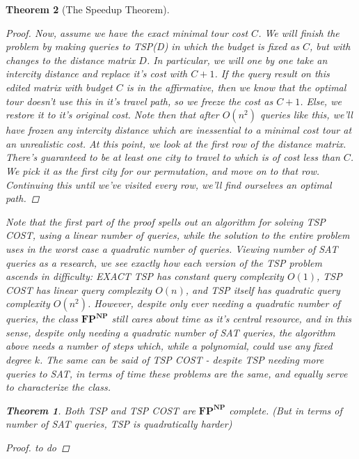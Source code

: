 \documentclass{article}
\theoremstyle{definition}
\theoremstyle{plain}
\theoremstyle{theorem}
\newtheorem{theorem}{Theorem}[section]
\begin{document}
\begin{theorem}[The Speedup Theorem]
\begin{proof}
    \par Now, assume we have the exact minimal tour cost $C$. We will finish the problem by making queries to TSP(D) in which the budget is fixed as $C$, but with changes to the distance matrix $D$. In particular, we will one by one take an intercity distance and replace it's cost with $C+1$. If the query result on this edited matrix with budget $C$ is in the affirmative, then we know that the optimal tour doesn't use this in it's travel path, so we freeze the cost as $C+1$. Else, we restore it to it's original cost. Note then that after $O(n^2)$ queries like this, we'll have frozen any intercity distance which are inessential to a minimal cost tour at an unrealistic cost. At this point, we look at the first row of the distance matrix. There's guaranteed to be at least one city to travel to which is of cost less than $C$. We pick it as the first city for our permutation, and move on to that row. Continuing this until we've visited every row, we'll find ourselves an optimal path.
\end{proof}
Note that the first part of the proof spells out an algorithm for solving TSP COST, using a linear number of queries, while the solution to the entire problem uses in the worst case a quadratic number of queries. Viewing number of SAT queries as a research, we see exactly how each version of the TSP problem ascends in difficulty: EXACT TSP has \textit{constant} query complexity $O(1)$, TSP COST has \textit{linear} query complexity $O(n)$, and TSP itself has \textit{quadratic} query complexity $O(n^2)$. However, despite only ever needing a quadratic number of queries, the class $\textbf{FP}^{\textbf{NP}}$ still cares about \textit{time} as it's central resource, and in this sense, despite only needing a quadratic number of SAT queries, the algorithm above needs a number of steps which, while a polynomial, could use any fixed degree $k$. The same can be said of TSP COST - despite TSP needing more queries to SAT, in terms of time these problems are the same, and equally serve to characterize the class.
\begin{theorem}
    Both TSP and TSP COST are $\textbf{FP}^{\textbf{NP}}$ complete. (But in terms of number of SAT queries, TSP is quadratically harder)
\end{theorem}
\begin{proof}
    to do
\end{proof}

\end{theorem}
\end{document}
